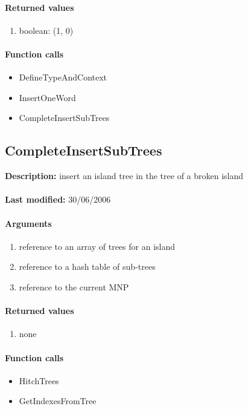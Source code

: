 \paragraph{Returned values}
\begin{enumerate}
\item boolean: (1, 0)
\end{enumerate}

\paragraph{Function calls}
\begin{itemize}
\item DefineTypeAndContext
\item InsertOneWord
\item CompleteInsertSubTrees
\end{itemize}

\subsection{CompleteInsertSubTrees}
\textbf{Description:} insert an island tree in the tree of a broken island\\
\\\textbf{Last modified:} 30/06/2006

\paragraph{Arguments}
\begin{enumerate}
\item reference to an array of trees for an island
\item reference to a hash table of sub-trees
\item reference to the current MNP
\end{enumerate}

\paragraph{Returned values}
\begin{enumerate}
\item none
\end{enumerate}

\paragraph{Function calls}
\begin{itemize}
\item HitchTrees
\item GetIndexesFromTree
\end{itemize}

